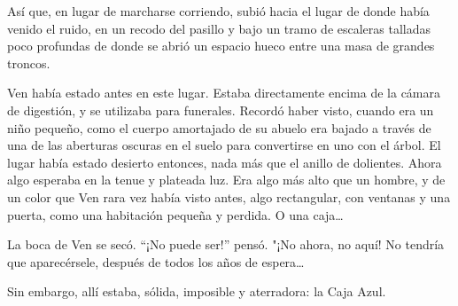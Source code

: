 Así que, en lugar de marcharse corriendo, subió hacia el lugar de donde
había venido el ruido, en un recodo del pasillo y bajo un tramo de
escaleras talladas poco profundas de donde se abrió un espacio hueco
entre una masa de grandes troncos.

Ven había estado antes en este lugar. Estaba directamente encima de la
cámara de digestión, y se utilizaba para funerales. Recordó haber visto,
cuando era un niño pequeño, como el cuerpo amortajado de su abuelo era
bajado a través de una de las aberturas oscuras en el suelo para
convertirse en uno con el árbol. El lugar había estado desierto
entonces, nada más que el anillo de dolientes. Ahora algo esperaba en la
tenue y plateada luz. Era algo más alto que un hombre, y de un color que
Ven rara vez había visto antes, algo rectangular, con ventanas y una
puerta, como una habitación pequeña y perdida. O una caja\ldots{}

La boca de Ven se secó. ``¡No puede ser!'' pensó. "¡No ahora, no aquí!
No tendría que aparecérsele, después de todos los años de espera\ldots{}

Sin embargo, allí estaba, sólida, imposible y aterradora: la Caja Azul.
